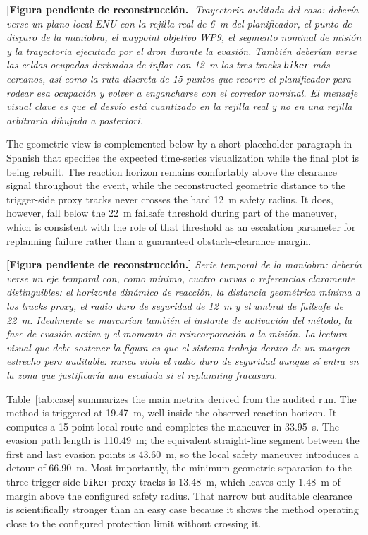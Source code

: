 \documentclass[a4paper,11pt]{article}
\newcommand{\diagramplaceholder}[1]{\par\smallskip\noindent\textbf{[Figura pendiente de reconstrucción.] } \emph{#1}\par\smallskip}
\begin{document}
\diagramplaceholder{Trayectoria auditada del caso: debería verse un plano local ENU con la rejilla real de \SI{6}{\meter} del planificador, el punto de disparo de la maniobra, el waypoint objetivo WP9, el segmento nominal de misión y la trayectoria ejecutada por el dron durante la evasión. También deberían verse las celdas ocupadas derivadas de inflar con \SI{12}{\meter} los tres tracks \texttt{biker} más cercanos, así como la ruta discreta de 15 puntos que recorre el planificador para rodear esa ocupación y volver a engancharse con el corredor nominal. El mensaje visual clave es que el desvío está cuantizado en la rejilla real y no en una rejilla arbitraria dibujada a posteriori.}

The geometric view is complemented below by a short placeholder paragraph in Spanish that specifies the expected time-series visualization while the final plot is being rebuilt. The reaction horizon remains comfortably above the clearance signal throughout the event, while the reconstructed geometric distance to the trigger-side proxy tracks never crosses the hard \SI{12}{\meter} safety radius. It does, however, fall below the \SI{22}{\meter} failsafe threshold during part of the maneuver, which is consistent with the role of that threshold as an escalation parameter for replanning failure rather than a guaranteed obstacle-clearance margin.

\diagramplaceholder{Serie temporal de la maniobra: debería verse un eje temporal con, como mínimo, cuatro curvas o referencias claramente distinguibles: el horizonte dinámico de reacción, la distancia geométrica mínima a los tracks proxy, el radio duro de seguridad de \SI{12}{\meter} y el umbral de failsafe de \SI{22}{\meter}. Idealmente se marcarían también el instante de activación del método, la fase de evasión activa y el momento de reincorporación a la misión. La lectura visual que debe sostener la figura es que el sistema trabaja dentro de un margen estrecho pero auditable: nunca viola el radio duro de seguridad aunque sí entra en la zona que justificaría una escalada si el replanning fracasara.}

Table~\ref{tab:case} summarizes the main metrics derived from the audited run. The method is triggered at \SI{19.47}{\meter}, well inside the observed reaction horizon. It computes a 15-point local route and completes the maneuver in \SI{33.95}{\second}. The evasion path length is \SI{110.49}{\meter}; the equivalent straight-line segment between the first and last evasion points is \SI{43.60}{\meter}, so the local safety maneuver introduces a detour of \SI{66.90}{\meter}. Most importantly, the minimum geometric separation to the three trigger-side \texttt{biker} proxy tracks is \SI{13.48}{\meter}, which leaves only \SI{1.48}{\meter} of margin above the configured safety radius. That narrow but auditable clearance is scientifically stronger than an easy case because it shows the method operating close to the configured protection limit without crossing it.
\end{document}
